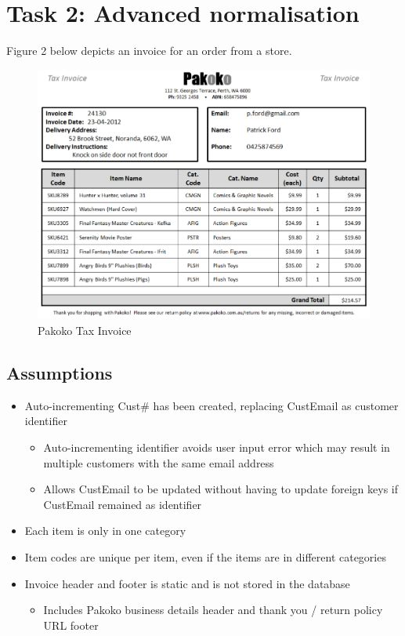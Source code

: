 \newpage
\section{Task 2: Advanced normalisation}

Figure 2 below depicts an invoice for an order from a store.

\begin{figure}[H]
\centering
\caption{Pakoko Tax Invoice}
\includegraphics[scale=1]{./img/task2.pdf}
\end{figure}

\subsection*{Assumptions}

\begin{itemize}
\item Auto-incrementing Cust\# has been created, replacing CustEmail as customer identifier
	\begin{itemize}
	\item Auto-incrementing identifier avoids user input error which may result in multiple customers with the same email address
	\item Allows CustEmail to be updated without having to update foreign keys if CustEmail remained as identifier
	\end{itemize}
\item Each item is only in one category
\item Item codes are unique per item, even if the items are in different categories
\item Invoice header and footer is static and is not stored in the database
	\begin{itemize}
	\item Includes Pakoko business details header and thank you / return policy URL footer
	\end{itemize}
\end{itemize}

